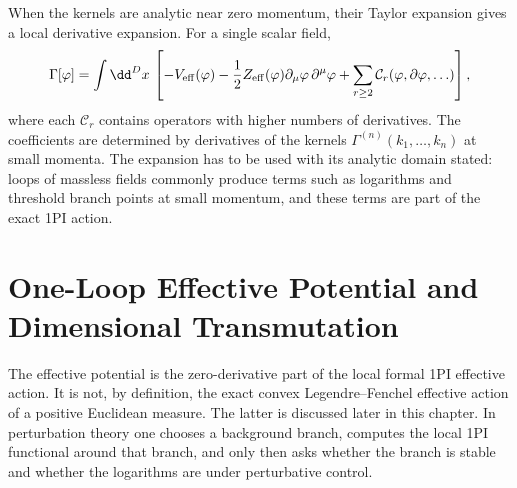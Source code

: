 \begin{definition}
\label{def:local-derivative-expansion-1pi-branch}
When the kernels are analytic near zero momentum, their Taylor expansion gives
a local derivative expansion.  For a single scalar field,
\[
  \Gamma[\varphi]
  =
  \int \dd^Dx\,
  \left[
    -V_{\rm eff}(\varphi)
    -\frac12 Z_{\rm eff}(\varphi)
      \partial_{\mu}\varphi\,\partial^{\mu}\varphi
    +\sum_{r\ge 2}
      \mathcal C_r(\varphi,\partial\varphi,\ldots)
  \right],
\]
where each \(\mathcal C_r\) contains operators with higher numbers of
derivatives.  The coefficients are determined by derivatives of the kernels
\(\Gamma^{(n)}(k_1,\ldots,k_n)\) at small momenta.  The expansion has to be
used with its analytic domain stated: loops of massless fields commonly
produce terms such as logarithms and threshold branch points at small
momentum, and these terms are part of the exact 1PI action.
\end{definition}

\section{One-Loop Effective Potential and Dimensional Transmutation}
\label{sec:coleman-weinberg-effective-potential}

The effective potential is the zero-derivative part of the local formal 1PI
effective action.  It is not, by definition, the exact convex
Legendre--Fenchel effective action of a positive Euclidean measure.  The latter
is discussed later in this chapter.  In perturbation theory one chooses a
background branch, computes the local 1PI functional around that branch, and
only then asks whether the branch is stable and whether the logarithms are
under perturbative control.

